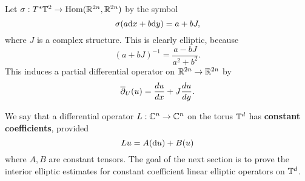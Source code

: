 \documentclass{amsart}
\begin{document}
  \begin{example}
    Let $\sigma:T^{*}\mathbb{T}^{2}\to \operatorname{\mathrm{Hom}}(\mathbb{R}^{2n},\mathbb{R}^{2n})$ by the symbol
    \begin{equation*}
      \sigma(a\mathrm{d} x+b\mathrm{d} y)=a+bJ,
    \end{equation*}
    where $J$ is a complex structure. This is clearly elliptic, because
    \begin{equation*}
      (a+bJ)^{-1}=\frac{a-bJ}{a^{2}+b^{2}}.
    \end{equation*}
    This induces a partial differential operator on $\mathbb{R}^{2n}\to \mathbb{R}^{2n}$ by
    \begin{equation*}
      \overline{\partial}_{U}(u)=\frac{du}{dx}+J\frac{du}{dy}.
    \end{equation*}
  \end{example}
  \begin{defn}
    We say that a differential operator $L:\mathbb{C}^{n}\to \mathbb{C}^{n}$ on the torus $\mathbb{T}^{d}$ has \textbf{constant coefficients}, provided
    \begin{equation*}
      Lu=A(\mathrm{d} u)+B(u)
    \end{equation*}
    where $A,B$ are constant tensors. The goal of the next section is to prove the interior elliptic estimates for constant coefficient linear elliptic operators on $\mathbb{T}^{d}$.
  \end{defn}
  \clearpage
\end{document}
